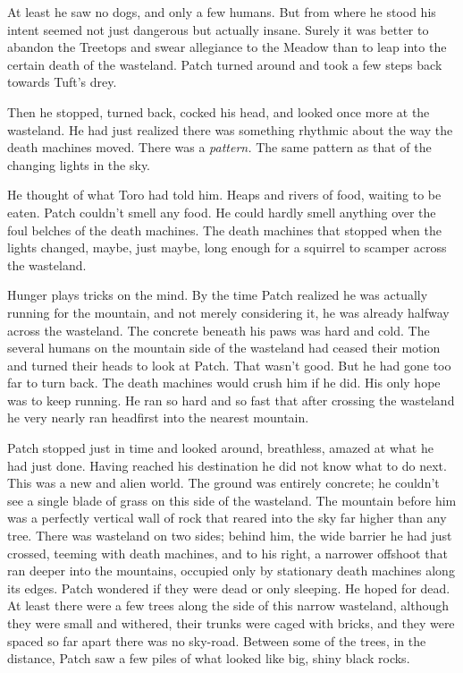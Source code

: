 \documentclass[ebook,oneside,openany,17pt]{memoir}
\begin{document}
At least he saw no dogs, and only a few humans. But from where he
stood his intent seemed not just dangerous but actually insane. Surely
it was better to abandon the Treetops and swear allegiance to the
Meadow than to leap into the certain death of the wasteland. Patch
turned around and took a few steps back towards Tuft’s drey.

Then he stopped, turned back, cocked his head, and looked once more at
the wasteland. He had just realized there was something rhythmic about
the way the death machines moved. There was a \emph{pattern.} The
same pattern as that of the changing lights in the sky.

He thought of what Toro had told him. Heaps and rivers of food,
waiting to be eaten. Patch couldn’t smell any food. He could hardly
smell anything over the foul belches of the death machines. The death
machines that stopped when the lights changed, maybe, just maybe, long
enough for a squirrel to scamper across the wasteland.

Hunger plays tricks on the mind. By the time Patch realized he was
actually running for the mountain, and not merely considering it, he
was already halfway across the wasteland. The concrete beneath his
paws was hard and cold. The several humans on the mountain side of the
wasteland had ceased their motion and turned their heads to look at
Patch. That wasn’t good. But he had gone too far to turn back. The
death machines would crush him if he did. His only hope was to keep
running. He ran so hard and so fast that after crossing the wasteland
he very nearly ran headfirst into the nearest mountain.

Patch stopped just in time and looked around, breathless, amazed at
what he had just done. Having reached his destination he did not know
what to do next. This was a new and alien world. The ground was
entirely concrete; he couldn’t see a single blade of grass on this
side of the wasteland. The mountain before him was a perfectly
vertical wall of rock that reared into the sky far higher than any
tree. There was wasteland on two sides; behind him, the wide barrier
he had just crossed, teeming with death machines, and to his right, a
narrower offshoot that ran deeper into the mountains, occupied only by
stationary death machines along its edges. Patch wondered if they were
dead or only sleeping. He hoped for dead. At least there were a few
trees along the side of this narrow wasteland, although they were
small and withered, their trunks were caged with bricks, and they were
spaced so far apart there was no sky-road. Between some of the trees,
in the distance, Patch saw a few piles of what looked like big, shiny
black rocks.
\end{document}
